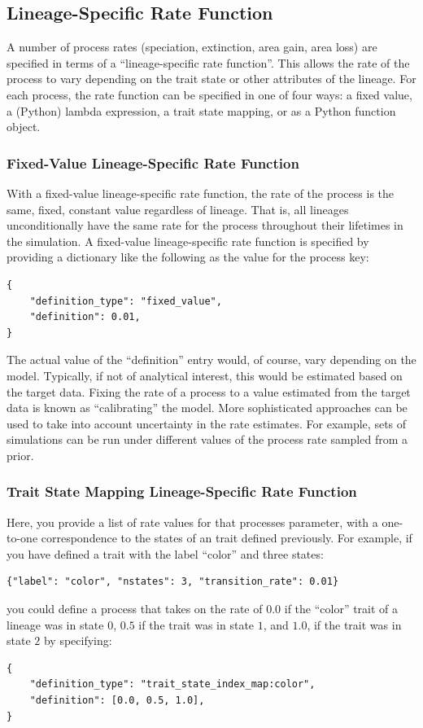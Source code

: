 \documentclass[11pt,openany]{memoir} %
\begin{document}
\subsection{Lineage-Specific Rate Function}

A number of process rates (speciation, extinction, area gain, area loss) are specified in terms of a ``lineage-specific rate function''.
This allows the rate of the process to vary depending on the trait state or other attributes of the lineage.
For each process, the rate function can be specified in one of four ways: a fixed value, a (Python) lambda expression, a trait state mapping, or as a Python function object.

\subsubsection{Fixed-Value Lineage-Specific Rate Function}
With a fixed-value lineage-specific rate function, the rate of the process is the same, fixed, constant value regardless of lineage.
That is, all lineages unconditionally have the same rate for the process throughout their lifetimes in the simulation.
A fixed-value lineage-specific rate function is specified by providing a dictionary like the following as the value for the process key:
\begin{lstlisting}
{
    "definition_type": "fixed_value",
    "definition": 0.01,
}
\end{lstlisting}
The actual value of the ``definition'' entry would, of course, vary depending on the model.
Typically, if not of analytical interest, this would be estimated based on the target data.
Fixing the rate of a process to a value estimated from the target data is known as ``calibrating'' the model.
More sophisticated approaches can be used to take into account uncertainty in the rate estimates.
For example, sets of simulations can be run under different values of the process rate sampled from a prior.

\subsubsection{Trait State Mapping Lineage-Specific Rate Function}
\label{sec:trait-state-mapping}
Here, you provide a list of rate values for that processes parameter, with a one-to-one correspondence to the states of an trait defined previously.
For example, if you have defined a trait with the label ``color'' and three states:
\begin{lstlisting}
{"label": "color", "nstates": 3, "transition_rate": 0.01}
\end{lstlisting}
you could define a process that takes on the rate of $0.0$ if the ``color'' trait of a lineage was in state $0$, $0.5$ if the trait was in state $1$, and $1.0$, if the trait was in state $2$ by specifying:
\begin{lstlisting}
{
    "definition_type": "trait_state_index_map:color",
    "definition": [0.0, 0.5, 1.0],
}
\end{lstlisting}
\end{document}
